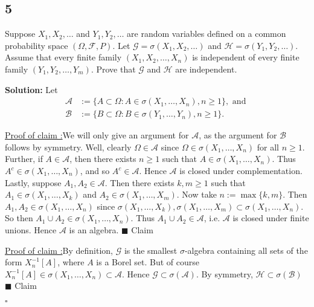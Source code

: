 \documentclass[12pt]{article}
\newcounter{ProofCounter}
\newcounter{ClaimCounter}[ProofCounter]
\newenvironment{Solution}{\stepcounter{ProofCounter}\textbf{Solution:}}{\hfill$\square$}
\newenvironment{claim}[1]{\vspace{1mm}\stepcounter{ClaimCounter}\par\noindent\underline{\bf Claim \theClaimCounter:}\space#1}{}
\newenvironment{claimproof}[1]{\par\noindent\underline{Proof of claim \theClaimCounter:}\space#1}{\hfill $\blacksquare$ Claim \theClaimCounter}
\begin{document}
\subsection*{5}
\begin{tcolorbox}
  Suppose $X_1, X_2, \dots$ and $Y_1, Y_2, \dots$ are random variables defined on a common probability space $(\Omega, \mathcal{F}, P)$. Let $\mathcal{G} = \sigma(X_1, X_2, \dots)$ and $\mathcal{H} = \sigma(Y_1, Y_2, \dots)$. Assume that every finite family $(X_1, X_2, \dots, X_n)$ is independent of every finite family $(Y_1, Y_2, \dots, Y_m)$. Prove that $\mathcal{G}$ and $\mathcal{H}$ are independent.
\end{tcolorbox}
\begin{Solution}
  Let 
  \begin{align*}
    \mathcal{A} & := \{ A \subset \Omega : A \in \sigma(X_1, \dots, X_n), n \geq 1 \}, \text{ and } \\
    \mathcal{B} & := \{ B \subset \Omega : B \in \sigma(Y_1, \dots, Y_n), n \geq 1 \}.
  \end{align*}

  \begin{claimproof}
    We will only give an argument for $\mathcal{A}$, as the argument for $\mathcal{B}$ follows by symmetry. Well, clearly $\Omega \in \mathcal{A}$ since $\Omega \in \sigma(X_1, \dots, X_n)$ for all $n \geq 1$. Further, if $A \in \mathcal{A}$, then there exists $n \geq 1$ such that $A \in \sigma(X_1, \dots, X_n)$. Thus $A^c \in \sigma(X_1, \dots, X_n)$, and so $A^c \in \mathcal{A}$. Hence $\mathcal{A}$ is closed under complementation. Lastly, suppose $A_1, A_2 \in \mathcal{A}$. Then there exists $k, m \geq 1$ such that $A_1 \in \sigma(X_1, \dots, X_k)$ and $A_2 \in \sigma(X_1, \dots, X_m)$. Now take $n := \max \{ k, m\}$. Then $A_1, A_2 \in \sigma(X_1, \dots, X_n)$ since $\sigma(X_1, \dots, X_k), \sigma(X_1, \dots, X_m) \subset \sigma(X_1, \dots, X_n)$. So then $A_1 \cup A_2 \in \sigma(X_1, \dots, X_n)$. Thus $A_1 \cup A_2 \in \mathcal{A}$, i.e. $\mathcal{A}$ is closed under finite unions. Hence $\mathcal{A}$ is an algebra.
  \end{claimproof}

  \begin{claimproof}
    By definition, $\mathcal{G}$ is the smallest $\sigma$-algebra containing all sets of the form $X_n^{-1}[A]$, where $A$ is a Borel set. But of course $X_n^{-1}[A] \in \sigma(X_1, \dots, X_n) \subset \mathcal{A}$. Hence $\mathcal{G} \subset \sigma(\mathcal{A})$. By symmetry, $\mathcal{H} \subset \sigma(\mathcal{B})$
  \end{claimproof}


\end{Solution}
\end{document}
